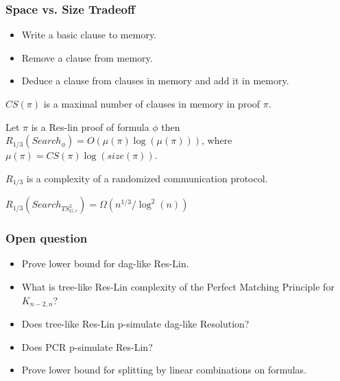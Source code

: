 \begin{frame}
    \frametitle{Space vs. Size Tradeoff}

    \pause
    \begin{itemize}
    	\item Write a basic clause to memory.
    	\item Remove a clause from memory.
    	\item Deduce a clause from clauses in memory and add it in memory.
    \end{itemize}

    \pause
    $CS(\pi)$ is a maximal number of clauses in memory in proof $\pi$.

    \pause
    \begin{theorem}
        Let $\pi$ is a Res-lin proof of formula $\phi$ then $R_{1 / 3}(Search_{\phi})
        = O(\mu(\pi) \log(\mu(\pi)))$, where $\mu(\pi) = CS(\pi) \log(size(\pi))$.
    \end{theorem}

    $R_{1 / 3}$ is a complexity of a randomized communication protocol.
    
    \pause

    $R_{1 / 3}(Search_{TS_{G,c}^2}) = \Omega(n^{1 / 3} / \log^2(n))$
\end{frame}


\begin{frame}
    \frametitle{Open question}

    \begin{itemize}
		\item Prove lower bound for dag-like Res-Lin.
		\item What is tree-like Res-Lin complexity of the Perfect Matching Principle
		    for $K_{n - 2, n}$? 
		\item Does tree-like Res-Lin p-simulate dag-like Resolution?
		\item Does PCR p-simulate Res-Lin?
		\item Prove lower bound for splitting by linear combinations on
		     formulas.
	\end{itemize}
\end{frame}


